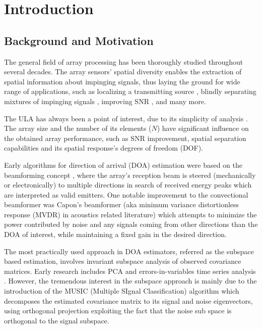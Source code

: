 \chapter{Introduction}
\label{chap:intro}
\section{Background and Motivation}
The general field of array processing has been thoroughly studied throughout several decades.
The array sensors' spatial diversity enables the extraction of spatial information about impinging signals, thus laying the ground for wide range of applications, such as localizing a transmitting source \cite{skolnik2008radar,long2019}, blindly separating mixtures of impinging signals \cite{comon1994independent}, improving SNR \cite{verdu1998multiuser}, and many more. 
\par The ULA has always been a point of interest, due to its simplicity of analysis \cite{van2004optimum,benesty2018}. 
The array size and the number of its elements ($N$) have significant influence on the obtained array performance, such as SNR improvement, spatial separation capabilities and its spatial response's degrees of freedom (DOF).
\par Early algorithms for direction of arrival (DOA) estimation were based on the beamforming concept \cite{krim1996two}, where the array's reception beam is steered (mechanically or electronically) to multiple directions in search of received energy peaks which are interpreted as valid emitters.
One notable improvement to the convectional beamformer \cite{van2004optimum} was Capon's beamformer  (aka minimum variance distortionless response (MVDR) in acoustics related literature) which attempts to minimize the power contributed by noise and any signals coming from other directions than the DOA of interest, while maintaining a fixed gain
in the desired direction.
\par The most practically used approach in DOA estimators, referred as the subspace based estimation, involves invariant subspace analysis of observed covariance matrices.
Early research includes PCA and errors-in-variables time series analysis \cite{krim1996two}.
However, the tremendous interest in the subspace approach is mainly due to the introduction of the
MUSIC (Multiple SIgnal Classification) algorithm \cite{schmidt1986multiple} which decomposes the estimated covariance matrix to its signal and noise eigenvectors, using orthogonal projection exploiting the fact that the noise sub space is orthogonal to the signal subspace.
